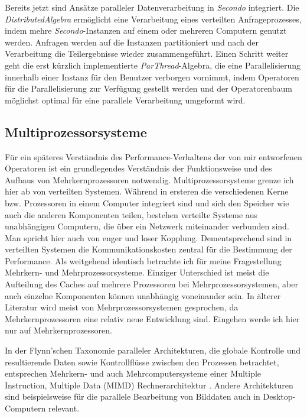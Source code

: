 \documentclass[a4paper,12pt,twoside]{article}
\newcommand{\Fb}[1]{\textit{#1}} %
\begin{document}
Bereits jetzt sind Ansätze paralleler Datenverarbeitung in \Fb{Secondo} integriert. Die \Fb{DistributedAlgebra} \parencite{Nidzwetzki2017} ermöglicht eine Verarbeitung eines verteilten Anfrageprozesses, indem mehre \Fb{Secondo}-Instanzen auf einem oder mehreren Computern genutzt werden. Anfragen werden auf die Instanzen partitioniert und nach der Verarbeitung die Teilergebnisse wieder zusammengeführt. Einen Schritt weiter geht die erst kürzlich implementierte \Fb{ParThread}-Algebra, die eine Parallelisierung innerhalb einer Instanz für den Benutzer verborgen vornimmt, indem Operatoren für die Parallelisierung zur Verfügung gestellt werden und der Operatorenbaum möglichst optimal für eine parallele Verarbeitung umgeformt wird.

\subsection{Multiprozessorsysteme}

Für ein späteres Verständnis des Performance-Verhaltens der von mir entworfenen Operatoren ist ein grundlegendes Verständnis der Funktionsweise und des Aufbaus von Mehrkernprozessoren notwendig. Multiprozessorsysteme grenze ich hier ab von verteilten Systemen. Während in ersteren die verschiedenen Kerne bzw. Prozessoren in einem Computer integriert sind und sich den Speicher wie auch die anderen Komponenten teilen, bestehen verteilte Systeme aus unabhängigen Computern, die über ein Netzwerk miteinander verbunden sind. Man spricht hier auch von enger und loser Kopplung. Dementsprechend sind in verteilten Systemen die Kommunikationskosten zentral für die Bestimmung der Performance. Als weitgehend identisch betrachte ich für meine Fragestellung Mehrkern- und Mehrprozessorsysteme. Einziger Unterschied ist meist die Aufteilung des Caches auf mehrere Prozessoren bei Mehrprozessorsystemen, aber auch einzelne Komponenten können unabhängig voneinander sein. In älterer Literatur wird meist von Mehrprozessorsystemen gesprochen, da Mehrkernprozessoren eine relativ neue Entwicklung sind. Eingehen werde ich hier nur auf Mehrkernprozessoren.

In der Flynn’schen Taxonomie paralleler Architekturen, die globale Kontrolle und resultierende Daten sowie Kontrollflüsse zwischen den Prozessen betrachtet, entsprechen Mehrkern- und auch Mehrcomputersysteme einer Multiple Instruction, Multiple Data (MIMD) Rechnerarchitektur \parencite[S. 10f]{Rauber2013}. Andere Architekturen sind beispielsweise für die parallele Bearbeitung von Bilddaten auch in Desktop-Computern relevant.
\end{document}
